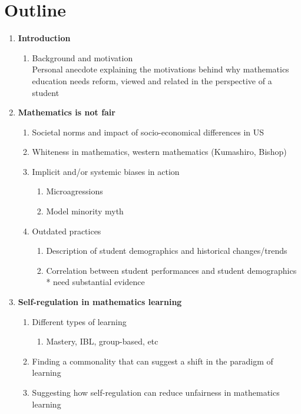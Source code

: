 \chapter{Outline}
\begin{enumerate}
  \item {\bf Introduction }
  \begin{enumerate}
    \item Background and motivation \\
      Personal anecdote explaining the motivations behind why mathematics education needs reform, viewed and related in the perspective of a student
  \end{enumerate}
  \item {\bf Mathematics is not fair }
    \begin{enumerate}
      \item Societal norms and impact of socio-economical differences in US
      \item Whiteness in mathematics, western mathematics (Kumashiro, Bishop)
      \item Implicit and/or systemic biases in action
      \begin{enumerate}
        \item Microagressions
        \item Model minority myth
      \end{enumerate}
      \item Outdated practices
      \begin{enumerate}
        \item Description of student demographics and historical changes/trends
        \item Correlation between student performances and student demographics
        \\ * need substantial evidence
      \end{enumerate}
    \end{enumerate}
    \item{\bf Self-regulation in mathematics learning}
    \begin{enumerate}
      \item Different types of learning
      \begin{enumerate}
        \item Mastery, IBL, group-based, etc
      \end{enumerate}
      \item Finding a commonality that can suggest a shift in the paradigm of learning
      \item Suggesting how self-regulation can reduce unfairness in mathematics learning

\end{enumerate}
\end{enumerate}
